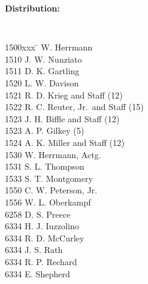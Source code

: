 %
%
{\bf Distribution:}
\par
%
{\tt %
\begin{tabbing}
1500xxx \=  \> W. Herrmann \\
1510 \> J. W. Nunziato \\
1511 \> D. K. Gartling \\
1520 \> L. W. Davison \\
1521 \> R. D. Krieg and Staff (12) \\
1522 \> R. C. Reuter, Jr.\ and Staff (15) \\
1523 \> J. H. Biffle and Staff (12) \\
1523 \> A. P. Gilkey (5) \\
1524 \> A. K. Miller and Staff (12) \\
1530 \> W. Herrmann, Actg. \\
1531 \> S. L. Thompson \\
1533 \> S. T. Montgomery \\
1550 \> C. W. Peterson, Jr.\ \\
1556 \> W. L. Oberkampf \\
6258 \> D. S. Preece \\
6334 \> H. J. Iuzzolino \\
6334 \> R. D. McCurley \\
6334 \> J. S. Rath \\
6334 \> R. P. Rechard \\
6334 \> E. Shepherd \\
\end{tabbing}
}
